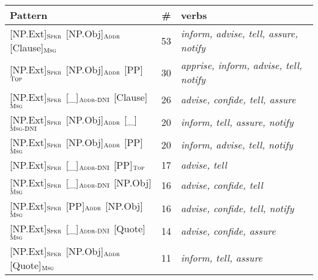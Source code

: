 \documentclass[output=paper,colorlinks,citecolor=brown]{langscibook}
\begin{document}
\begin{table}
    \centering\footnotesize
    \begin{tabularx}{\textwidth}{ lrQ }
\lsptoprule
         Pattern  & \#  & verbs \\
\midrule
{[NP.Ext]}$_{\text{\textsc{Spkr}}}$ {[NP.Obj]}$_{\text{\textsc{Addr}}}$ {[Clause]}$_{\text{\textsc{Msg}}}$  & 53 & \textit{inform, advise, tell, assure, notify}\\

{[NP.Ext]}$_{\text{\textsc{Spkr}}}$ {[NP.Obj]}$_{\text{\textsc{Addr}}}$ {[PP]}$_{\text{\textsc{Top}}}$  & 30 & \textit{apprise, inform, advise, tell, notify}\\

{[NP.Ext]}$_{\text{\textsc{Spkr}}}$ {[\_]}$_{\text{\textsc{Addr-DNI}}}$ {[Clause]}$_{\text{\textsc{Msg}}}$  & 26 & \textit{advise, confide, tell, assure}\\

{[NP.Ext]}$_{\text{\textsc{Spkr}}}$ {[NP.Obj]}$_{\text{\textsc{Addr}}}$ {[\_]}$_{\text{\textsc{Msg-DNI}}}$  & 20 & \textit{inform, tell, assure, notify}\\

{[NP.Ext]}$_{\text{\textsc{Spkr}}}$ {[NP.Obj]}$_{\text{\textsc{Addr}}}$ {[PP]}$_{\text{\textsc{Msg}}}$  & 20 & \textit{inform, advise, tell, notify}\\

{[NP.Ext]}$_{\text{\textsc{Spkr}}}$ {[\_]}$_{\text{\textsc{Addr-DNI}}}$ {[PP]}$_{\text{\textsc{Top}}}$  & 17 & \textit{advise, tell}\\

{[NP.Ext]}$_{\text{\textsc{Spkr}}}$ {[\_]}$_{\text{\textsc{Addr-DNI}}}$ {[NP.Obj]}$_{\text{\textsc{Msg}}}$  & 16 & \textit{advise, confide, tell}\\

{[NP.Ext]}$_{\text{\textsc{Spkr}}}$ {[PP]}$_{\text{\textsc{Addr}}}$ {[NP.Obj]}$_{\text{\textsc{Msg}}}$  & 16 & \textit{advise, confide, tell, notify}\\

{[NP.Ext]}$_{\text{\textsc{Spkr}}}$ {[\_]}$_{\text{\textsc{Addr-DNI}}}$ {[Quote]}$_{\text{\textsc{Msg}}}$  & 14 & \textit{advise, confide, assure}\\

{[NP.Ext]}$_{\text{\textsc{Spkr}}}$ {[NP.Obj]}$_{\text{\textsc{Addr}}}$ {[Quote]}$_{\text{\textsc{Msg}}}$  & 11 & \textit{inform, tell, assure}\\




\end{tabularx}
\end{table}
\end{document}
